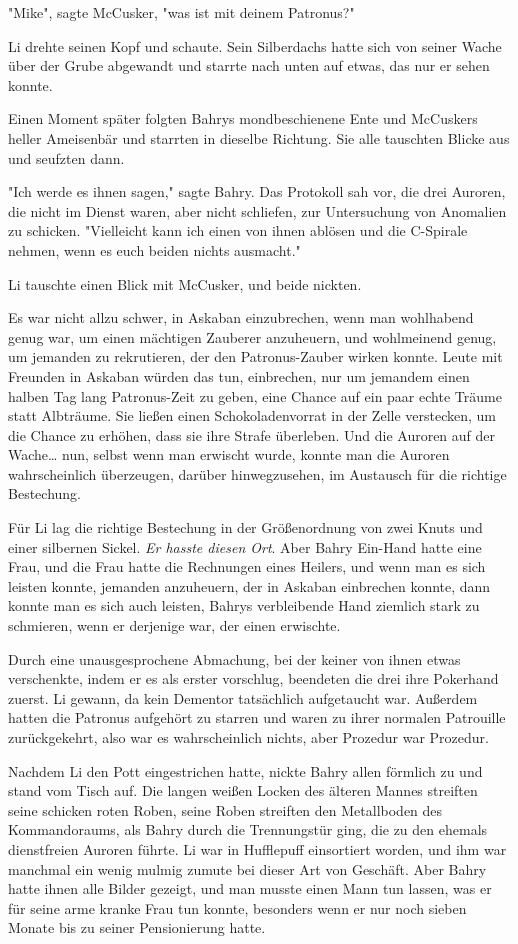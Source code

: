 {"Mike", sagte McCusker, "was ist mit deinem Patronus?"

Li drehte seinen Kopf und schaute. Sein Silberdachs hatte sich von seiner Wache über der Grube abgewandt und starrte nach unten auf etwas, das nur er sehen konnte.

Einen Moment später folgten Bahrys mondbeschienene Ente und McCuskers heller Ameisenbär und starrten in dieselbe Richtung. Sie alle tauschten Blicke aus und seufzten dann.

"Ich werde es ihnen sagen," sagte Bahry. Das Protokoll sah vor, die drei Auroren, die nicht im Dienst waren, aber nicht schliefen, zur Untersuchung von Anomalien zu schicken. "Vielleicht kann ich einen von ihnen ablösen und die C-Spirale nehmen, wenn es euch beiden nichts ausmacht."

Li tauschte einen Blick mit McCusker, und beide nickten.

Es war nicht allzu schwer, in Askaban einzubrechen, wenn man wohlhabend genug war, um einen mächtigen Zauberer anzuheuern, und wohlmeinend genug, um jemanden zu rekrutieren, der den Patronus-Zauber wirken konnte. Leute mit Freunden in Askaban würden das tun, einbrechen, nur um jemandem einen halben Tag lang Patronus-Zeit zu geben, eine Chance auf ein paar echte Träume statt Albträume. Sie ließen einen Schokoladenvorrat in der Zelle verstecken, um die Chance zu erhöhen, dass sie ihre Strafe überleben. Und die Auroren auf der Wache… nun, selbst wenn man erwischt wurde, konnte man die Auroren wahrscheinlich überzeugen, darüber hinwegzusehen, im Austausch für die richtige Bestechung.

Für Li lag die richtige Bestechung in der Größenordnung von zwei Knuts und einer silbernen Sickel. \emph{Er hasste diesen Ort}. Aber Bahry Ein-Hand hatte eine Frau, und die Frau hatte die Rechnungen eines Heilers, und wenn man es sich leisten konnte, jemanden anzuheuern, der in Askaban einbrechen konnte, dann konnte man es sich auch leisten, Bahrys verbleibende Hand ziemlich stark zu schmieren, wenn er derjenige war, der einen erwischte.

Durch eine unausgesprochene Abmachung, bei der keiner von ihnen etwas verschenkte, indem er es als erster vorschlug, beendeten die drei ihre Pokerhand zuerst. Li gewann, da kein Dementor tatsächlich aufgetaucht war. Außerdem hatten die Patronus aufgehört zu starren und waren zu ihrer normalen Patrouille zurückgekehrt, also war es wahrscheinlich nichts, aber Prozedur war Prozedur.

Nachdem Li den Pott eingestrichen hatte, nickte Bahry allen förmlich zu und stand vom Tisch auf. Die langen weißen Locken des älteren Mannes streiften seine schicken roten Roben, seine Roben streiften den Metallboden des Kommandoraums, als Bahry durch die Trennungstür ging, die zu den ehemals dienstfreien Auroren führte. Li war in Hufflepuff einsortiert worden, und ihm war manchmal ein wenig mulmig zumute bei dieser Art von Geschäft. Aber Bahry hatte ihnen alle Bilder gezeigt, und man musste einen Mann tun lassen, was er für seine arme kranke Frau tun konnte, besonders wenn er nur noch sieben Monate bis zu seiner Pensionierung hatte.

}
